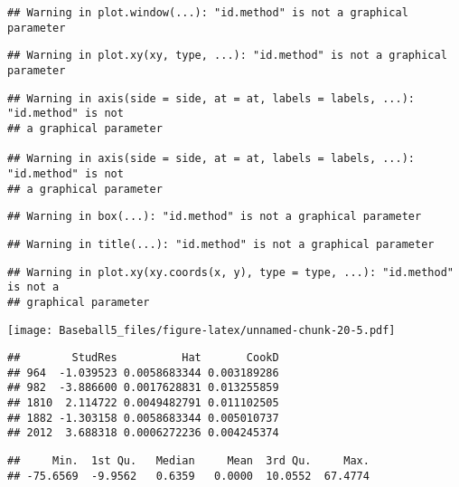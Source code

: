 \documentclass[
]{article}
\newenvironment{Shaded}{\begin{snugshade}}{\end{snugshade}}
\newcommand{\FunctionTok}[1]{\textcolor[rgb]{0.00,0.00,0.00}{#1}}
\newcommand{\NormalTok}[1]{#1}
\newcommand{\SpecialCharTok}[1]{\textcolor[rgb]{0.00,0.00,0.00}{#1}}
\begin{document}
\begin{verbatim}
## Warning in plot.window(...): "id.method" is not a graphical parameter
\end{verbatim}

\begin{verbatim}
## Warning in plot.xy(xy, type, ...): "id.method" is not a graphical parameter
\end{verbatim}

\begin{verbatim}
## Warning in axis(side = side, at = at, labels = labels, ...): "id.method" is not
## a graphical parameter

## Warning in axis(side = side, at = at, labels = labels, ...): "id.method" is not
## a graphical parameter
\end{verbatim}

\begin{verbatim}
## Warning in box(...): "id.method" is not a graphical parameter
\end{verbatim}

\begin{verbatim}
## Warning in title(...): "id.method" is not a graphical parameter
\end{verbatim}

\begin{verbatim}
## Warning in plot.xy(xy.coords(x, y), type = type, ...): "id.method" is not a
## graphical parameter
\end{verbatim}

\texttt{[image: Baseball5\_files/figure-latex/unnamed-chunk-20-5.pdf]}

\begin{verbatim}
##        StudRes          Hat       CookD
## 964  -1.039523 0.0058683344 0.003189286
## 982  -3.886600 0.0017628831 0.013255859
## 1810  2.114722 0.0049482791 0.011102505
## 1882 -1.303158 0.0058683344 0.005010737
## 2012  3.688318 0.0006272236 0.004245374
\end{verbatim}

\begin{Shaded}
\end{Shaded}

\begin{verbatim}
##     Min.  1st Qu.   Median     Mean  3rd Qu.     Max. 
## -75.6569  -9.9562   0.6359   0.0000  10.0552  67.4774
\end{verbatim}
\end{document}
